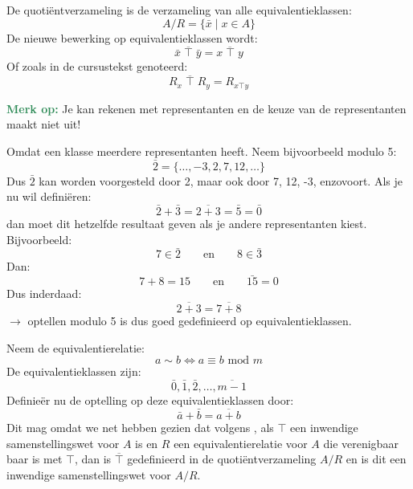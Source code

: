 De quotiëntverzameling is de verzameling van alle equivalentieklassen:
\begin{equation*}
    A/R = \{\bar{x} \mid x \in A\}
\end{equation*}
De nieuwe bewerking op equivalentieklassen wordt:
\begin{equation*}
    \bar{x}\;\overline{\top}\; \bar{y} = \overline{x\;\top\;y}
\end{equation*}
Of zoals in de cursustekst genoteerd:
\begin{equation*}
    R_x \;\overline{\top}\; R_y = R_{x \top y}
\end{equation*}

\begin{barbox}[SeaGreen][gray!5]
    \textcolor{SeaGreen}{\textbf{Merk op:}} Je kan rekenen met representanten en de keuze van de representanten maakt niet uit!
\end{barbox}


Omdat een klasse meerdere representanten heeft. Neem bijvoorbeeld modulo 5:
\begin{equation*}
    \bar{2} = \{\dots, -3, 2, 7, 12, \dots\}
\end{equation*}
Dus $\bar{2}$ kan worden voorgesteld door 2, maar ook door 7, 12, -3, enzovoort. Als je nu wil definiëren:
\begin{equation*}
    \bar{2} + \bar{3} = \overline{2+3} = \bar{5} = \bar{0}
\end{equation*}
dan moet dit hetzelfde resultaat geven als je andere representanten kiest. Bijvoorbeeld:
\begin{equation*}
    7 \in \bar{2} \qquad \text{en} \qquad 8 \in \bar{3}
\end{equation*}
Dan:
\begin{equation*}
    7+8=15 \qquad \text{en} \qquad \bar{15} = 0
\end{equation*}
Dus inderdaad:
\begin{equation*}
    \overline{2+3} = \overline{7+8}
\end{equation*}
$\longrightarrow$ optellen modulo 5 is dus goed gedefinieerd op equivalentieklassen.

\textbf{}\newline
Neem de equivalentierelatie:
\begin{equation*}
    a \sim b \Leftrightarrow a \equiv b \text{ mod } m
\end{equation*}
De equivalentieklassen zijn:
\begin{equation*}
    \bar{0}, \bar{1}, \bar{2}, \dots, \overline{m-1}
\end{equation*}
Definieër nu de optelling op deze equivalentieklassen door:
\begin{equation*}
    \bar{a} + \bar{b} = \overline{a + b}
\end{equation*}
Dit mag omdat we net hebben gezien dat volgens , als $\top$ een inwendige samenstellingswet voor $A$ is en $R$ een equivalentierelatie voor $A$ die verenigbaar baar is met $\top$, dan is $\overline{\top}$ gedefinieerd in de quotiëntverzameling $A/R$ en is dit een inwendige samenstellingswet voor $A/R$.


